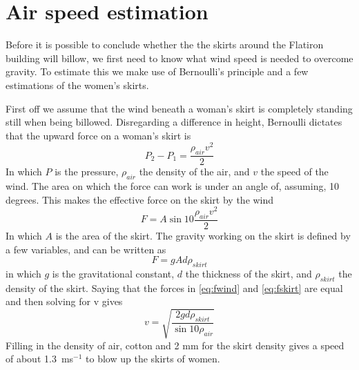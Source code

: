 \clearpage\appendix
\section{Air speed estimation}
\label{airspeedestimation}
Before it is possible to conclude whether the the skirts around the Flatiron building will billow, we first need to know what wind speed is needed to overcome gravity. To estimate this we make use of Bernoulli's principle and a few estimations of the women's skirts.

First off we assume that the wind beneath a woman's skirt is completely standing still when being billowed. Disregarding a difference in height, Bernoulli dictates that the upward force on a woman's skirt is
\begin{equation}
P_2 - P_1 = \frac{\rho_{air}v^2}{2}
\end{equation}
In which $P$ is the pressure, $\rho_{air}$ the density of the air, and $v$ the speed of the wind. The area on which the force can work is under an angle of, assuming, 10 degrees. This makes the effective force on the skirt by the wind
\begin{equation}
F = A \sin{10} \frac{\rho_{air}v^2}{2}
\label{eq:fwind}
\end{equation}
In which $A$ is the area of the skirt. The gravity working on the skirt is defined by a few variables, and can be written as
\begin{equation}
F = g A d \rho_{skirt}
\label{eq:fskirt}
\end{equation}
in which $g$ is the gravitational constant, $d$ the thickness of the skirt, and $\rho_{skirt}$ the density of the skirt. Saying that the forces in \autoref{eq:fwind} and \autoref{eq:fskirt} are equal and then solving for v gives
\begin{equation}
v = \sqrt{\frac{2 g d \rho_{skirt}}{\sin{10} \rho_{air}}}
\end{equation}
Filling in the density of air, cotton and 2 mm for the skirt density gives a speed of about 1.3~ms$^{-1}$ to blow up the skirts of women.

